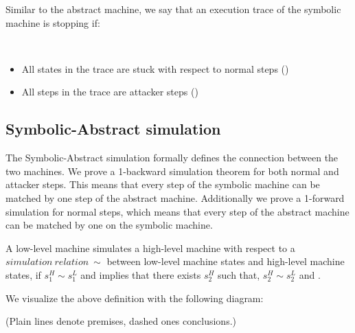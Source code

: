 Similar to the abstract machine, we say that an execution trace of the
symbolic machine is stopping if:

\begin{definition}
\label{symbolic_stopping}
~
\begin{itemize}
\item All states in the trace are stuck with respect to normal steps
  (\stepn{}{})
\item All steps in the trace are attacker steps (\stepa{}{}{})
\end{itemize}
\end{definition}

\subsection{Symbolic-Abstract  simulation}
\label{sec:refinement_SA}

The Symbolic-Abstract simulation formally defines the connection
between the two machines. We prove a 1-backward simulation theorem for
both normal and attacker steps. This means that every step of the
symbolic machine can be matched by one step of the abstract machine.
Additionally we prove a 1-forward simulation for normal steps,
which means that every step of the abstract machine can be matched
by one on the symbolic machine.


\begin{definition}
\label{simulation_LH}
  A low-level machine simulates a high-level machine with respect to a
  $simulation~relation~\sim$ between low-level machine states and
  high-level machine states, if $s^H_1 \sim s_1^L$ and
   implies that there exists $s^H_2$ such that,
  $s^H_2 \sim s^L_2$ and .

We visualize the above definition with the following diagram:

%
\vspace{-\smallskipamount}
 \begin{center}
  \end{center}
\vspace{-\smallskipamount}
(Plain lines denote premises, dashed ones conclusions.)
\end{definition}


